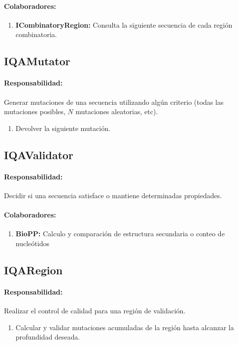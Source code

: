 \documentclass[a4paper,10pt]{article}
\begin{document}
    \paragraph{Colaboradores:}
      \begin{enumerate}
       \item \textbf{ICombinatoryRegion:} Consulta la siguiente secuencia de
cada regi\'on combinatoria.
      \end{enumerate}

  \subsection{IQAMutator}
    \paragraph{Responsabilidad:} Generar mutaciones de una secuencia
utilizando alg\'un criterio (todas las mutaciones posibles, $N$
mutaciones aleatorias, etc).
      \begin{enumerate}
       \item Devolver la siguiente mutaci\'on.
      \end{enumerate}    

  \subsection{IQAValidator}
    \paragraph{Responsabilidad:} Decidir si una secuencia satisface o
mantiene determinadas propiedades.
    \paragraph{Colaboradores:}
      \begin{enumerate}
       \item \textbf{BioPP:} Calculo y comparaci\'on de estructura secundaria o
conteo de nucle\'otidos
      \end{enumerate}

  \subsection{IQARegion}
    \paragraph{Responsabilidad:} Realizar el control de calidad para una
regi\'on de validaci\'on.
      \begin{enumerate}
       \item Calcular y validar mutaciones acumuladas de la regi\'on hasta
alcanzar la profundidad deseada.
      \end{enumerate}
\end{document}
